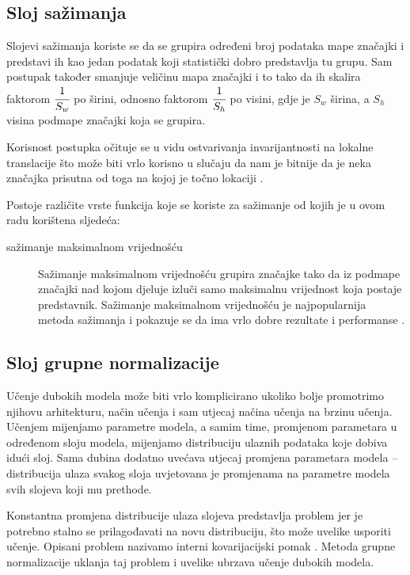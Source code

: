 \documentclass[times, utf8, diplomski, numeric]{fer}
\begin{document}
\subsection{Sloj sažimanja}
Slojevi sažimanja koriste se da se grupira određeni broj podataka mape značajki i predstavi ih kao jedan podatak koji statistički dobro predstavlja tu grupu.
Sam postupak također smanjuje veličinu mapa značajki i to tako da ih skalira faktorom $\cfrac{1}{S_w}$ po širini, odnosno faktorom $\cfrac{1}{S_h}$ po visini, gdje je $S_w$ širina, a $S_h$ visina podmape značajki koja se grupira.

Korisnost postupka očituje se u vidu ostvarivanja invarijantnosti na lokalne translacije što može biti vrlo korisno u slučaju da nam je bitnije da je neka značajka prisutna od toga na kojoj je točno lokaciji \citep{seminar:rela}.

Postoje različite vrste funkcija koje se koriste za sažimanje od kojih je u ovom radu korištena sljedeća:
\begin{description}  
\item [sažimanje maksimalnom vrijednošću]
Sažimanje maksimalnom vrijednošću  grupira značajke tako da iz podmape značajki nad kojom djeluje izluči samo maksimalnu vrijednost koja postaje predstavnik.
Sažimanje maksimalnom vrijednošću je najpopularnija metoda sažimanja i pokazuje se da ima vrlo dobre rezultate i performanse \citep{article:maxpooling_article}.
\end{description}

\subsection{Sloj grupne normalizacije }
Učenje dubokih modela može biti vrlo komplicirano ukoliko bolje promotrimo njihovu arhitekturu, način učenja i sam utjecaj načina učenja na brzinu učenja.
Učenjem mijenjamo parametre modela, a samim time, promjenom parametara u određenom sloju modela, mijenjamo distribuciju ulaznih podataka koje dobiva idući sloj.
Sama dubina dodatno uvećava utjecaj promjena parametara modela -- distribucija ulaza svakog sloja uvjetovana je promjenama na parametre modela svih slojeva koji mu prethode.

Konstantna promjena distribucije ulaza slojeva predstavlja problem jer je potrebno stalno se prilagođavati na novu distribuciju, što može uvelike usporiti učenje.
Opisani problem nazivamo interni kovarijacijski pomak . 
Metoda grupne normalizacije  uklanja taj problem i uvelike ubrzava učenje dubokih modela.
\end{document}
